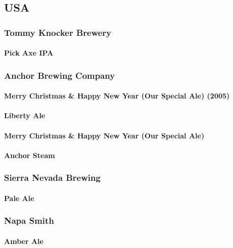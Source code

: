 \documentclass[11pt]{article}
\begin{document}
\subsection{USA}
\label{sec:org56679f9}
\subsubsection{Tommy Knocker Brewery}
\label{sec:org6817b4a}
\paragraph{Pick Axe IPA}
\label{sec:orga487c60}
\subsubsection{Anchor Brewing Company}
\label{sec:orgc4f186f}
\paragraph{Merry Christmas \& Happy New Year (Our Special Ale) (2005)}
\label{sec:org6c7101b}
\paragraph{Liberty Ale}
\label{sec:orge68f13f}
\paragraph{Merry Christmas \& Happy New Year (Our Special Ale)}
\label{sec:org1330cd5}
\paragraph{Anchor Steam}
\label{sec:org56bc192}
\subsubsection{Sierra Nevada Brewing}
\label{sec:orga518150}
\paragraph{Pale Ale}
\label{sec:org92fbbab}
\subsubsection{Napa Smith}
\label{sec:org4c7c774}
\paragraph{Amber Ale}
\label{sec:org33d05f8}
\end{document}
